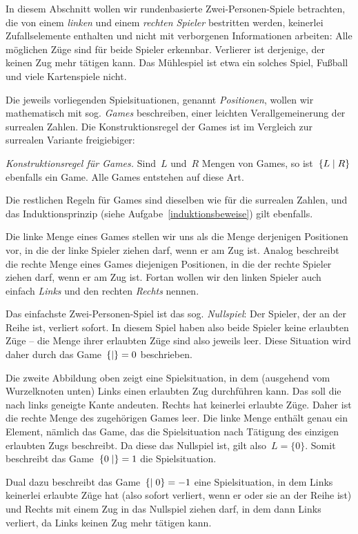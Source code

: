 \documentclass{../zirkelblatt}
\begin{document}
In diesem Abschnitt wollen wir rundenbasierte Zwei-Personen-Spiele betrachten,
die von einem \emph{linken} und einem \emph{rechten Spieler} bestritten werden,
keinerlei Zufallselemente enthalten und nicht mit verborgenen Informationen
arbeiten: Alle möglichen Züge sind für beide Spieler erkennbar. Verlierer ist
derjenige, der keinen Zug mehr tätigen kann. Das Mühlespiel ist etwa ein
solches Spiel, Fußball und viele Kartenspiele nicht.

Die jeweils vorliegenden Spielsituationen, genannt \emph{Positionen}, wollen wir
mathematisch mit sog. \emph{Games} beschreiben, einer leichten
Verallgemeinerung der surrealen Zahlen. Die Konstruktionsregel der Games ist
im Vergleich zur surrealen Variante freigiebiger:

\emph{Konstruktionsregel für Games.}
Sind~$L$ und~$R$ Mengen von Games,
so ist~$\{ L \mathrel{|} R \}$ ebenfalls ein Game. Alle Games entstehen auf diese Art.

Die restlichen Regeln für Games sind dieselben wie für die surrealen Zahlen,
und das Induktionsprinzip (siehe Aufgabe~\ref{induktionsbeweise}) gilt
ebenfalls.

Die linke Menge eines Games stellen wir uns als die Menge derjenigen Positionen
vor, in die der linke Spieler ziehen darf, wenn er am Zug ist. Analog
beschreibt die rechte Menge eines Games diejenigen Positionen, in die der rechte
Spieler ziehen darf, wenn er am Zug ist. Fortan wollen wir den linken Spieler
auch einfach \emph{Links} und den rechten \emph{Rechts} nennen.

Das einfachste Zwei-Personen-Spiel ist das sog. \emph{Nullspiel}: Der Spieler,
der an der Reihe ist, verliert sofort. In diesem Spiel haben also beide Spieler
keine erlaubten Züge -- die Menge ihrer erlaubten Züge sind also jeweils leer.
Diese Situation wird daher durch das Game~$\{  \mathrel{|}  \} = 0$ beschrieben.

Die zweite Abbildung oben zeigt eine Spielsituation, in dem (ausgehend vom Wurzelknoten
unten) Links einen erlaubten Zug durchführen kann. Das soll die
nach links geneigte Kante andeuten. Rechts hat keinerlei erlaubte
Züge. Daher ist die rechte Menge des zugehörigen Games leer. Die linke Menge
enthält genau ein Element, nämlich das Game, das die Spielsituation nach
Tätigung des einzigen erlaubten Zugs beschreibt. Da diese das Nullspiel ist,
gilt also~$L = \{ 0 \}$. Somit beschreibt das Game~$\{ 0 \mathrel{|}  \} = 1$ die
Spielsituation.

Dual dazu beschreibt das Game~$\{  \mathrel{|} 0 \} = -1$ eine Spielsituation, in dem
Links keinerlei erlaubte Züge hat (also sofort verliert, wenn er oder sie an der
Reihe ist) und Rechts mit einem Zug in das Nullspiel ziehen darf, in dem
dann Links verliert, da Links keinen Zug mehr tätigen kann.
\end{document}
